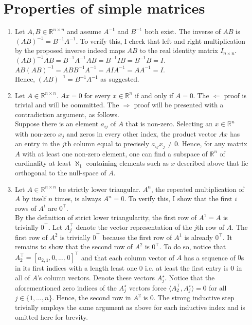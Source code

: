 \documentclass[12pt,fleqn,leqno,letterpaper]{article}
\begin{document}
\section{Properties of simple matrices}
\begin{enumerate}
    \item Let $A,B \in \mathbb{R}^{n\times n}$ and assume $A^{-1}$ and $B^{-1}$
        both exist. The inverse of $AB$ is $(AB)^{-1} = B^{-1}A^{-1}$. To verify
        this, I check that left and right multiplication by the proposed inverse
        indeed maps $AB$ to the real identity matrix $I_{n\times n}$.\\
        $(AB)^{-1}AB = B^{-1}A^{-1}AB = B^{-1}IB = B^{-1}B = I$.\\
        $AB(AB)^{-1} = ABB^{-1}A^{-1} = AIA^{-1} = AA^{-1} = I$.\\
        Hence, $(AB)^{-1} = B^{-1}A^{-1}$ as suggested.

    \item Let $A\in\mathbb{R}^{n\times n}$. $Ax=0$ for every $x\in\mathbb{R}^n$
        if and only if $A=0$. The $\Leftarrow$ proof is trivial and will be
        oommitted. The $\Rightarrow$ proof will be presented with a contradiction
        argument, as follows.\\
        Suppose there is an element $a_{ij}$ of $A$ that is non-zero. Selecting
        an $x\in\mathbb{R}^n$ with non-zero $x_j$ and zeros in every other
        index, the product vector $Ax$ has an entry in the $j$th column equal to
        precisely $a_{ij}x_j\neq 0$. Hence, for any matrix $A$ with at least one
        non-zero element, one can find a subspace of $\mathbb{R}^n$ of
        cardinality at least $\aleph_1$ containing elements such as $x$
        described above that lie orthogonal to the null-space of $A$.

    \item Let $A\in\mathbb{R}^{n\times n}$ be strictly lower triangular. $A^n$,
        the repeated multiplication of $A$ by itself $n$ times, is always
        $A^n=0$. To verify this, I show that the first $i$ rows of $A^i$ are
        $0^\top$.\\
        By the definition of strict lower triangularity, the first row of
        $A^1=A$ is trivially $0^\top$. Let $A_j^\top$ denote the vector
        representation of the $j$th row of $A$. The first row of $A^2$ is
        trivially $0^\top$ because the first row of $A^1$ is already $0^\top$.
        It remains to show that the second row of $A^2$ is $0^\top$. To do so,
        notice that $A_2^\top = [a_{2,1}, 0, \dots, 0]^\top$ and that each
        column vector of $A$ has a sequence of $0$s in its first indices with
        a length least one $0$ i.e. at least the first entry is $0$ in all of
        $A$'s column vectors. Denote these vectors $A_j^\star$. Notice that the
        aforementioned zero indices of the $A_j^\star$ vectors force
        $\langle A_2^\top, A_j^\star \rangle = 0$ for all $j\in\{1,\dots,n\}$.
        Hence, the second row in $A^2$ is $0$. The strong inductive step
        trivially employs the same argument as above for each inductive index
        and is omitted here for brevity.


\end{enumerate}
\end{document}
